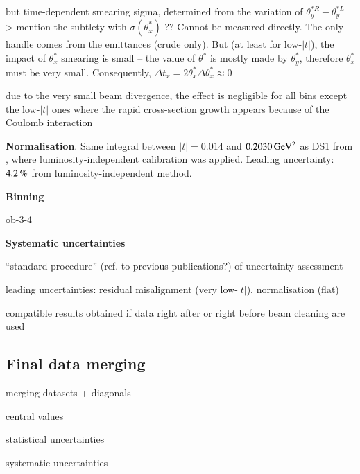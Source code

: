 \> but time-dependent smearing sigma, determined from the variation of $\theta_y^{*R} - \theta_y^{*L}$
\>> mention the subtlety with $\sigma(\theta_x^*)$ ?? Cannot be measured directly. The only handle comes from the emittances (crude only). But (at least for low-$|t|$), the impact of $\theta_x^*$ smearing is small -- the value of $\theta^*$ is mostly made by $\theta_y^*$, therefore $\theta_x^*$ must be very small. Consequently, $\Delta t_x = 2 \theta_x^* \Delta \theta_x^* \approx 0$

\> due to the very small beam divergence, the effect is negligible for all bins except the low-$|t|$ ones where the rapid cross-section growth appears because of the Coulomb interaction

{\bf Normalisation}. Same integral between $|t| = 0.014$ and $0.2030\,{\rm GeV^2}$ as DS1 from \cite{prl111}, where luminosity-independent calibration was applied. Leading uncertainty: $4.2\,{\rm \%}$ from luminosity-independent method. 


{\bf Binning}

\> ob-3-4

{\bf Systematic uncertainties}

\> ``standard procedure'' (ref. to previous publications?) of uncertainty assessment

\> leading uncertainties: residual misalignment (very low-$|t|$), normalisation (flat)

\> compatible results obtained if data right after or right before beam cleaning are used



\subsection{Final data merging}

\> merging datasets + diagonals

\> central values

\> statistical uncertainties

\> systematic uncertainties


\begin{table}
\vskip-5mm
\caption{%
: The elastic differential cross-section as determined in this analysis using the optimised binning. The left-most three columns describe bins in $t$. The representative point give the $t$ value suitable for fitting
\cite{lafferty94}. %
TODO: optimise number of digits, spacing.
}
\vskip-3mm
\label{tab:data}
\begin{center}

\end{center}
\vskip-10mm
\end{table}


